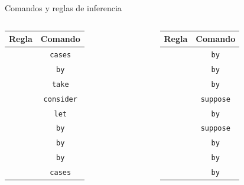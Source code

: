 \documentclass[xcolor={dvipsnames},spanish]{beamer}
\begin{document}
\begin{frame}{Comandos y reglas de inferencia}
    \begin{columns}
        \begin{column}{0.5\textwidth}
            \begin{table}[H]
                \centering
                \begin{tabular}{c|c}
                Regla & Comando \\
                \hline
                        &   \lstinline|cases| \\
                         &   \lstinline|by| \\
                    &   \lstinline|take| \\
                    &   \lstinline|consider| \\
                    &   \lstinline|let| \\
                    &   \lstinline|by| \\
                     &   \lstinline|by| \\
                     &   \lstinline|by| \\
                        &   \lstinline|cases|
                \end{tabular}
            \end{table}
        \end{column}
        \begin{column}{0.5\textwidth}
            \begin{table}[H]
                \centering
                \begin{tabular}{c|c}
                Regla & Comando \\
                \hline
                       &   \lstinline|by| \\
                    &   \lstinline|by| \\
                    &   \lstinline|by| \\
                       &   \lstinline|suppose| \\
                       &   \lstinline|by| \\
                       &   \lstinline|suppose| \\
                       &   \lstinline|by| \\
                      &   \lstinline|by| \\
                     &   \lstinline|by|
                \end{tabular}
            \end{table}
        \end{column}
    \end{columns}
\end{frame}
\end{document}
